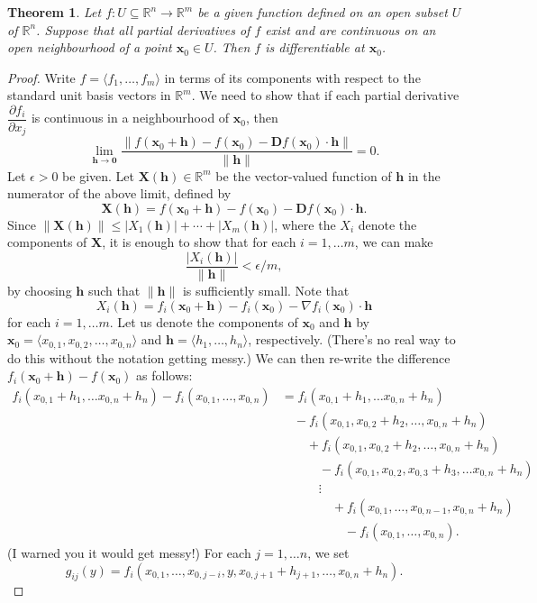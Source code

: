 \documentclass[12pt,letterpaper]{article}
\newtheorem{theorem}{Theorem}[section]
\newcommand{\R}{\mathbb{R}}
\newcommand{\D}{\mathbf{D}}
\newcommand{\x}{\mathbf{x}}
\newcommand{\h}{\mathbf{h}}
\begin{document}
\begin{theorem}
Let $f:U\subseteq \R^n\to \R^m$ be a given function defined on an open subset $U$ of $\R^n$. Suppose that all partial derivatives of $f$ exist and are continuous on an open neighbourhood of a point $\x_0\in U$. Then $f$ is differentiable at $\x_0$.
\end{theorem}
\begin{proof}
Write $f=\langle f_1,\ldots, f_m\rangle$ in terms of its components with respect to the standard unit basis vectors in $\R^m$. We need to show that if each partial derivative $\dfrac{\partial f_i}{\partial x_j}$ is continuous in a neighbourhood of $\x_0$, then
\[
\lim_{\h\to\mathbf{0}}\frac{\lVert f(\x_0+\h)-f(\x_0)-\D f(\x_0)\cdot \h\rVert}{\lVert\h\rVert} = 0.
\]
Let $\epsilon>0$ be given. Let $\mathbf{X}(\h)\in\R^m$ be the vector-valued function of $\h$ in the numerator of the above limit, defined by
\[
\mathbf{X}(\h) = f(\x_0+\h)-f(\x_0)-\D f(\x_0)\cdot \h.
\]
Since $\lVert \mathbf{X}(\h)\rVert \leq \lvert X_1(\h)\rvert+\cdots +\lvert X_m(\h)\rvert$, where the $X_i$ denote the components of $\mathbf{X}$, it is enough to show that for each $i=1,\ldots m$, we can make
\[
\frac{|X_i(\h)|}{\lVert \h\rVert}<\epsilon/m,
\]
by choosing $\h$ such that $\lVert\h\rVert$ is sufficiently small. Note that
\[
X_i(\h) = f_i(\x_0+\h)-f_i(\x_0)-\nabla f_i(\x_0)\cdot \h
\]
for each $i=1,\ldots m$. Let us denote the components of $\x_0$ and $\h$ by $\x_0 = \langle x_{0,1}, x_{0,2}, \ldots , x_{0,n}\rangle$ and $\h = \langle h_1,\ldots, h_n\rangle$, respectively. (There's no real way to do this without the notation getting messy.) We can then re-write the difference $f_i(\x_0+\h)-f(\x_0)$ as follows:
\begin{align*}
f_i(x_{0,1}+h_1,\ldots x_{0,n}+h_n)-f_i(x_{0,1},\ldots ,x_{0,n}) & = f_i(x_{0,1}+h_1,\ldots x_{0,n}+h_n)\\
&\quad - f_i(x_{0,1},x_{0,2}+h_2,\ldots, x_{0,n}+h_n)\\
&\quad\quad + f_i(x_{0,1},x_{0,2}+h_2,\ldots, x_{0,n}+h_n)\\
&\quad\quad\quad-f_i(x_{0,1},x_{0,2},x_{0,3}+h_3,\ldots x_{0,n}+h_n)\\
&\quad\quad\quad \vdots\\
&\quad\quad\quad\quad + f_i(x_{0,1},\ldots, x_{0,n-1},x_{0,n}+h_n)\\
&\quad\quad\quad\quad\quad -f_i(x_{0,1},\ldots ,x_{0,n}).
\end{align*}
(I warned you it would get messy!) For each $j=1,\ldots n$, we set
\[
g_{ij}(y) = f_i(x_{0,1},\ldots, x_{0,j-i},y,x_{0,j+1}+h_{j+1},\ldots, x_{0,n}+h_n).
\]
\end{proof}
\end{document}
